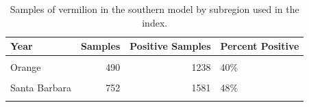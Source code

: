 \documentclass[11pt,
  english,
  a4paper,
]{article}
\begin{document}
\FloatBarrier

\begin{table}

\caption{\label{tab:tab-region-cpfvonboard}Samples of vermilion in the southern model by subregion used in the index.}
\centering
\begin{tabular}[t]{lrrl}
\toprule
Year & Samples & Positive Samples & Percent Positive\\
\midrule
\cellcolor{gray!6}{Los Angeles} & \cellcolor{gray!6}{1865} & \cellcolor{gray!6}{4319} & \cellcolor{gray!6}{43\%}\\
Orange & 490 & 1238 & 40\%\\
\cellcolor{gray!6}{San Diego} & \cellcolor{gray!6}{1152} & \cellcolor{gray!6}{2408} & \cellcolor{gray!6}{48\%}\\
Santa Barbara & 752 & 1581 & 48\%\\
\cellcolor{gray!6}{Ventura} & \cellcolor{gray!6}{1701} & \cellcolor{gray!6}{4672} & \cellcolor{gray!6}{36\%}\\
\bottomrule
\end{tabular}
\end{table}
\end{document}
